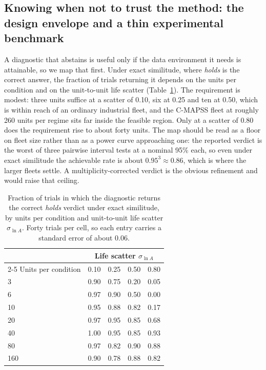 \documentclass[review,times]{elsarticle}
\theoremstyle{definition}
\theoremstyle{remark}
\begin{document}
\subsection{Knowing when not to trust the method: the design envelope and a thin experimental
benchmark}\label{sec:res-diag}
A diagnostic that abstains is useful only if the data environment it needs is attainable, so we map
that first. Under exact similitude, where \emph{holds} is the correct answer, the fraction of trials
returning it depends on the units per condition and on the unit-to-unit life scatter
(Table~\ref{tab:power}). The requirement is modest: three units suffice at a scatter of 0.10, six at
0.25 and ten at 0.50, which is within reach of an ordinary industrial fleet, and the C-MAPSS fleet
at roughly 260 units per regime sits far inside the feasible region. Only at a scatter of 0.80 does
the requirement rise to about forty units. The map should be read as a floor on fleet size rather
than as a power curve approaching one: the reported verdict is the worst of three pairwise interval
tests at a nominal 95\% each, so even under exact similitude the achievable rate is about
$0.95^3\approx0.86$, which is where the larger fleets settle. A multiplicity-corrected verdict is
the obvious refinement and would raise that ceiling.

\begin{table}[t]\centering\footnotesize
\setlength{\tabcolsep}{12pt}\renewcommand{\arraystretch}{1.2}
\caption{Fraction of trials in which the diagnostic returns the correct \emph{holds} verdict under
exact similitude, by units per condition and unit-to-unit life scatter $\sigma_{\ln A}$. Forty
trials per cell, so each entry carries a standard error of about 0.06.}\label{tab:power}
\begin{tabular}{@{}lcccc@{}}\toprule
& \multicolumn{4}{c}{Life scatter $\sigma_{\ln A}$} \\\cmidrule(lr){2-5}
Units per condition & 0.10 & 0.25 & 0.50 & 0.80 \\\midrule
3   & 0.90 & 0.75 & 0.20 & 0.05 \\
6   & 0.97 & 0.90 & 0.50 & 0.00 \\
10  & 0.95 & 0.88 & 0.82 & 0.17 \\
20  & 0.97 & 0.95 & 0.85 & 0.68 \\
40  & 1.00 & 0.95 & 0.85 & 0.93 \\
80  & 0.97 & 0.82 & 0.90 & 0.88 \\
160 & 0.90 & 0.78 & 0.88 & 0.82 \\\bottomrule
\end{tabular}
\end{table}
\end{document}
